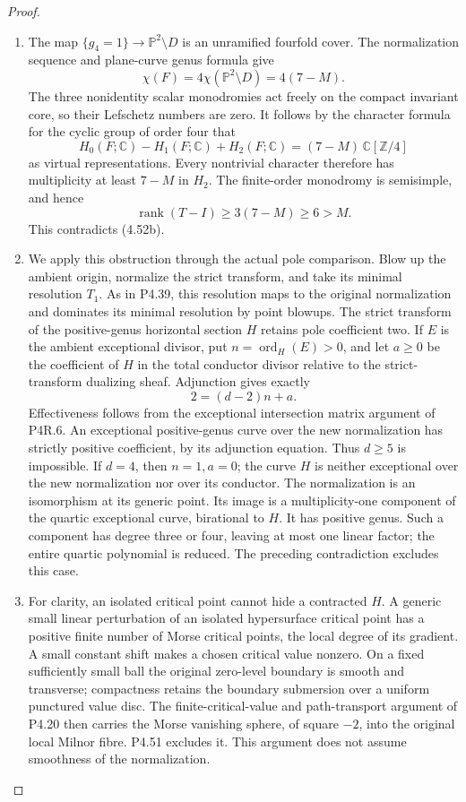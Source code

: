 \begin{proof}
\begin{enumerate}[label={$\langle1\rangle$\arabic*.},leftmargin=*]
\item The map $\{g_4=1\}\to\mathbb P^2\setminus D$ is
an unramified fourfold cover. The normalization
sequence and plane-curve genus formula give
\[
              \chi(F)=4\chi(\mathbb P^2\setminus D)
                      =4(7-M).
\]
The three nonidentity scalar monodromies act freely
on the compact invariant core, so their Lefschetz
numbers are zero. It follows by the character
formula for the cyclic group of order four that
\[
 H_0(F;\mathbb C)-H_1(F;\mathbb C)+H_2(F;\mathbb C)
       =(7-M)\,\mathbb C[\mathbb Z/4]
\]
as virtual representations. Every nontrivial
character therefore has multiplicity at least
$7-M$ in $H_2$. The finite-order monodromy is
semisimple, and hence
\[
             \operatorname{rank}(T-I)
                   \ge3(7-M)\ge6>M.                       \tag{4.52c}
\]
This contradicts (4.52b).

\item We apply this obstruction through the actual pole
comparison. Blow up the ambient origin, normalize
the strict transform, and take its minimal
resolution $T_1$. As in P4.39, this resolution maps
to the original normalization and dominates its
minimal resolution by point blowups. The strict
transform of the positive-genus horizontal section
$H$ retains pole coefficient two. If $E$ is the
ambient exceptional divisor, put
$n=\operatorname{ord}_H(E)>0$, and let $a\ge0$
be the coefficient of $H$ in the total conductor
divisor relative to the strict-transform dualizing
sheaf. Adjunction gives exactly
\[
                          2=(d-2)n+a.                     \tag{4.52d}
\]
Effectiveness follows from the exceptional
intersection matrix argument of P4R.6. An
exceptional positive-genus curve over the new
normalization has strictly positive coefficient,
by its adjunction equation. Thus $d\ge5$ is
impossible. If $d=4$, then $n=1,a=0$; the curve
$H$ is neither exceptional over the new
normalization nor over its conductor. The
normalization is an isomorphism at its generic
point. Its image is a multiplicity-one component
of the quartic exceptional curve, birational to
$H$. It has positive genus. Such a component has
degree three or four, leaving at most one linear
factor; the entire quartic polynomial is reduced.
The preceding contradiction excludes this case.

\item For clarity, an isolated critical point cannot
hide a contracted $H$. A generic small linear
perturbation of an isolated hypersurface critical
point has a positive finite number of Morse
critical points, the local degree of its gradient.
A small constant shift makes a chosen critical
value nonzero. On a fixed sufficiently small ball
the original zero-level boundary is smooth and
transverse; compactness retains the boundary
submersion over a uniform punctured value disc.
The finite-critical-value and path-transport
argument of P4.20 then carries the Morse
vanishing sphere, of square $-2$, into the
original local Milnor fibre. P4.51 excludes it.
This argument does not assume smoothness of the
normalization.


\end{enumerate}
\end{proof}
